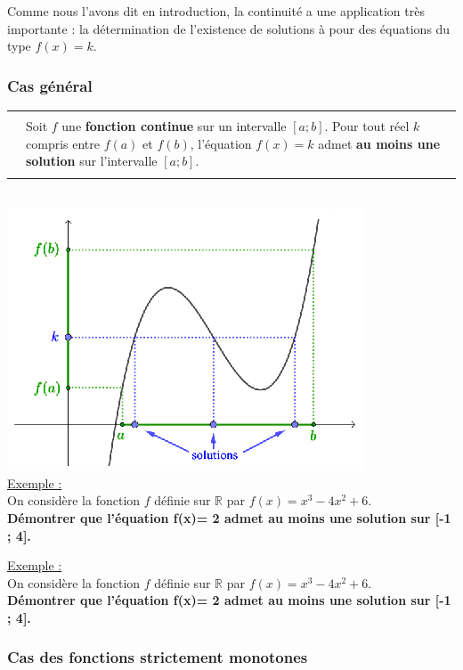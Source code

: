 \documentclass[a4paper,12pt,twoside,french]{extarticle}
\newtheorem{defi}{\textcolor{DarkSeaGreen4}{\underline{\sffamily D�finition} :}}
\newcommand{\R}{\ensuremath{\mathbb{R}}\xspace}
\newcommand{\prop}[1]{
\setlength{\arrayrulewidth}{0.5pt}
\arrayrulecolor{purple}
\noindent \begin{tabularx}{18.9cm}{p{0.8cm}XX}
	\multicolumn{2}{c}{\rule[-6.5pt]{0cm}{20pt}\psframebox[shadow=true, shadowsize=1.5pt,shadowcolor=gray,linewidth=0.25pt, linecolor=darkgray, fillstyle=gradient,gradangle=0, gradbegin=Red1,gradend=Red4, gradmidpoint=1,framearc=0.3, framesep=1pt]{\makebox[3cm]{\rule[-2pt]{0cm}{15pt} \textcolor{white}{\sffamily \textbf{Propriété}}}}} \tabularnewline %
	 & \multicolumn{2}{|l}{\begin{minipage}{14.7cm}\setlength{\arrayrulewidth}{0.75pt}\arrayrulecolor{black}\bigskip \normalfont #1 \medskip \end{minipage}} \tabularnewline
	\arrayrulecolor{purple}
	\cline{2-3} 
\end{tabularx}
\arrayrulecolor{black}
\setlength{\arrayrulewidth}{0.75pt}
\medskip}
\begin{document}
    
  Comme nous l'avons dit en introduction, la continuité a une application très importante : la détermination de l'existence de solutions à pour des équations du type $f (x) = k$.\\


\subsubsection{Cas général}


\prop{
Soit $f$ une \textbf{fonction continue} sur un intervalle $[a; b]$. Pour tout réel $k$ compris entre $f(a)$ et $f(b)$, l'équation $f(x) = k$ admet \textbf{au moins une solution} sur l'intervalle $[a; b]$.
}\\

\includegraphics[scale=1.8]{tvigal.eps} \\

\underline{Exemple :}\\
On considère la fonction $f$ définie sur $\R$ par $f(x)=x^3-4x^2+6$.\\
\textbf{Démontrer que l'équation f(x)=  2 admet au moins une solution sur [-1 ; 4].}\\
\newpage

\underline{Exemple :}\\
On considère la fonction $f$ définie sur $\R$ par $f(x)=x^3-4x^2+6$.\\
\textbf{Démontrer que l'équation f(x)=  2 admet au moins une solution sur [-1 ; 4].}\\

\vspace*{5cm}


\subsubsection{Cas des fonctions strictement monotones}
\end{document}
